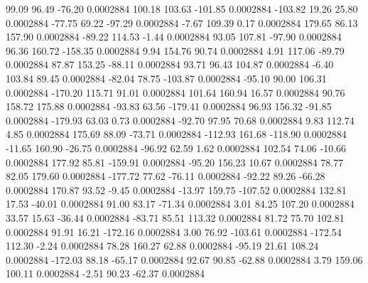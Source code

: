        99.09       96.49      -76.20     0.0002884
      100.18      103.63     -101.85     0.0002884
     -103.82       19.26       25.80     0.0002884
      -77.75       69.22      -97.29     0.0002884
       -7.67      109.39        0.17     0.0002884
      179.65       86.13      157.90     0.0002884
      -89.22      114.53       -1.44     0.0002884
       93.05      107.81      -97.90     0.0002884
       96.36      160.72     -158.35     0.0002884
        9.94      154.76       90.74     0.0002884
        4.91      117.06      -89.79     0.0002884
       87.87      153.25      -88.11     0.0002884
       93.71       96.43      104.87     0.0002884
       -6.40      103.84       89.45     0.0002884
      -82.04       78.75     -103.87     0.0002884
      -95.10       90.00      106.31     0.0002884
     -170.20      115.71       91.01     0.0002884
      101.64      160.94       16.57     0.0002884
       90.76      158.72      175.88     0.0002884
      -93.83       63.56     -179.41     0.0002884
       96.93      156.32      -91.85     0.0002884
     -179.93       63.03        0.73     0.0002884
      -92.70       97.95       70.68     0.0002884
        9.83      112.74        4.85     0.0002884
      175.69       88.09      -73.71     0.0002884
     -112.93      161.68     -118.90     0.0002884
      -11.65      160.90      -26.75     0.0002884
      -96.92       62.59        1.62     0.0002884
      102.54       74.06      -10.66     0.0002884
      177.92       85.81     -159.91     0.0002884
      -95.20      156.23       10.67     0.0002884
       78.77       82.05      179.60     0.0002884
     -177.72       77.62      -76.11     0.0002884
      -92.22       89.26      -66.28     0.0002884
      170.87       93.52       -9.45     0.0002884
      -13.97      159.75     -107.52     0.0002884
      132.81       17.53      -40.01     0.0002884
       91.00       83.17      -71.34     0.0002884
        3.01       84.25      107.20     0.0002884
       33.57       15.63      -36.44     0.0002884
      -83.71       85.51      113.32     0.0002884
       81.72       75.70      102.81     0.0002884
       91.91       16.21     -172.16     0.0002884
        3.00       76.92     -103.61     0.0002884
     -172.54      112.30       -2.24     0.0002884
       78.28      160.27       62.88     0.0002884
      -95.19       21.61      108.24     0.0002884
     -172.03       88.18      -65.17     0.0002884
       92.67       90.85      -62.88     0.0002884
        3.79      159.06      100.11     0.0002884
       -2.51       90.23      -62.37     0.0002884
